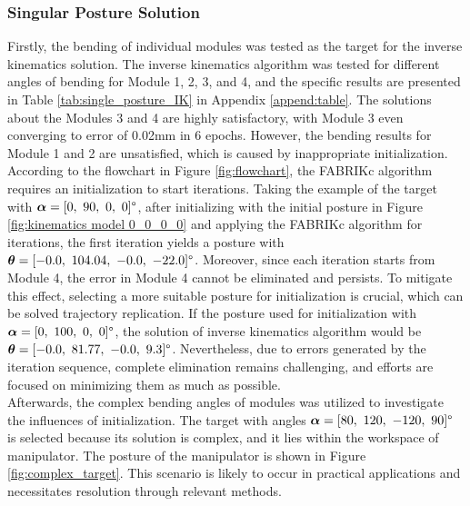 \subsubsection{Singular Posture Solution}
Firstly, the bending of individual modules was tested as the target for the inverse kinematics solution. The 
inverse kinematics algorithm was tested for different angles of bending for Module 1, 2, 3, and 4, and the 
specific results are presented in Table \ref{tab:single_posture_IK} in Appendix \ref{append:table}. The 
solutions about the Modules 3 and 4 are highly satisfactory, with Module 3 even converging to error of 0.02mm 
in 6 epochs. However, the bending results for Module 1 and 2 are unsatisfied, which is caused by inappropriate 
initialization. According to the flowchart in Figure \ref{fig:flowchart}, the FABRIKc algorithm requires an 
initialization to start iterations. Taking the example of the target with 
$\boldsymbol{\alpha} = [0,\ 90,\ 0,\ 0]\degree$, after initializing with the initial posture in Figure 
\ref{fig:kinematics model 0_0_0_0} and applying the FABRIKc algorithm for iterations, the first iteration yields 
a posture with 
$\boldsymbol{\theta} = [-0.0,\ 104.04,\ -0.0,\ -22.0]\degree$. Moreover, since each iteration starts from Module 4, the error 
in Module 4 cannot be eliminated and persists. To mitigate this effect, selecting a more suitable posture for 
initialization is crucial, which can be solved trajectory replication. If the posture used for initialization with 
$\boldsymbol{\alpha} = [0,\ 100,\ 0,\ 0]\degree$, the solution of inverse kinematics algorithm would be 
$\boldsymbol{\theta} = [-0.0,\ 81.77,\ -0.0,\ 9.3]\degree$. Nevertheless, due to errors generated by the iteration sequence, 
complete elimination remains challenging, and efforts are focused on minimizing them as much as possible. \\
Afterwards, the complex bending angles of modules was utilized to investigate the influences of initialization. 
The target with angles $\boldsymbol{\alpha} = [80,\ 120,\ -120,\ 90]\degree$ is selected because its solution is complex, and 
it lies within the workspace of manipulator. The posture of the manipulator is shown in Figure 
\ref{fig:complex_target}. This scenario is likely to occur in practical applications and necessitates resolution 
through relevant methods.
